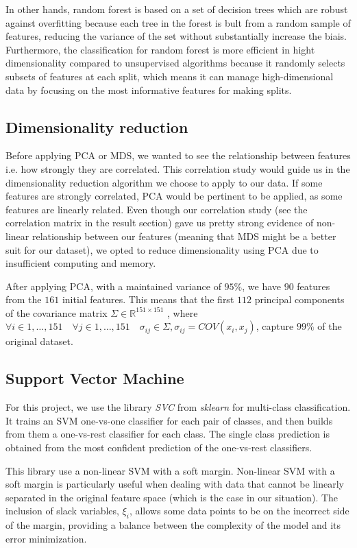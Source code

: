 \documentclass[twocolumn]{article}
\begin{document}
In other hands, random forest is based on a set of decision trees which are robust against overfitting because each tree in the forest is bult from a random sample of features, reducing the variance of the set without substantially increase the biais. Furthermore, the classification for random forest is more efficient in hight dimensionality compared to unsupervised algorithms because it randomly selects subsets of features at each split, which means it can manage high-dimensional data by focusing on the most informative features for making splits.


\subsection{Dimensionality reduction}
Before applying PCA or MDS, we wanted to see the relationship between features i.e. how strongly they are correlated. This correlation study would guide us in the dimensionality reduction algorithm we choose to apply to our data. If some features are strongly correlated, PCA would be pertinent to be applied, as some features are linearly related. Even though our correlation study (see the correlation matrix in the result section) gave us pretty strong evidence of non-linear relationship between our features (meaning that MDS might be a better suit for our dataset), we opted to reduce dimensionality using PCA due to insufficient computing and memory.

After applying PCA, with a maintained variance of $95\%$, we have $90$ features from the $161$ initial features. This means that the first $112$ principal components of the covariance matrix $\Sigma \in \mathbb{R}^{151 \times 151}$ , where $\forall i \in 1, \ldots, 151 \quad \forall j \in 1, \ldots, 151 \quad \sigma_{ij} \in \Sigma, \sigma_{ij} = COV(x_i, x_j)$, capture $99\%$ of the original dataset.

\subsection{Support Vector Machine}
For this project, we use the library \textit{SVC} from \textit{sklearn} for multi-class classification. It trains an SVM one-vs-one classifier for each pair of classes, and then builds from them a one-vs-rest classifier for each class. The single class prediction is obtained from the most confident prediction of the one-vs-rest classifiers. 

This library use a non-linear SVM with a soft margin. Non-linear SVM with a soft margin is particularly useful when dealing with data that cannot be linearly separated in the original feature space (which is the case in our situation). The inclusion of slack variables, \(\xi_i\), allows some data points to be on the incorrect side of the margin, providing a balance between the complexity of the model and its error minimization.\\
\end{document}
